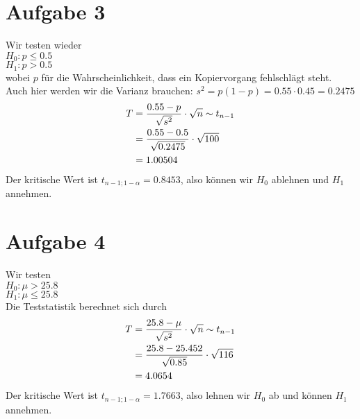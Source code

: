 \documentclass{article}
\begin{document}
	\section*{Aufgabe 3}
	Wir testen wieder \\
	$H_0: p\le 0.5$ \\
	$H_1: p>0.5$ \\
	wobei $p$ für die Wahrscheinlichkeit, dass ein Kopiervorgang fehlschlägt steht. Auch hier werden wir die Varianz brauchen: $s^2=p(1-p)=0.55\cdot 0.45=0.2475$
	\begin{align}
		T &= \frac{0.55-p}{\sqrt{s^2}}\cdot\sqrt{n} \sim t_{n-1} \notag \\
		&= \frac{0.55-0.5}{\sqrt{0.2475}}\cdot\sqrt{100} \notag \\
		&= 1.00504 \notag
	\end{align}
	Der kritische Wert ist $t_{n-1;1-\alpha}=0.8453$, also können wir $H_0$ ablehnen und $H_1$ annehmen.

	\section*{Aufgabe 4}
	Wir testen \\
	$H_0:\mu> 25.8$ \\
	$H_1:\mu\le 25.8$ \\
	Die Teststatistik berechnet sich durch
	\begin{align}
		T &= \frac{25.8 - \mu}{\sqrt{s^2}}\cdot\sqrt{n} \sim t_{n-1} \notag \\
		&= \frac{25.8 - 25.452}{\sqrt{0.85}}\cdot\sqrt{116} \notag \\
		&= 4.0654 \notag
	\end{align}
	Der kritische Wert ist $t_{n-1;1-\alpha}=1.7663$, also lehnen wir $H_0$ ab und können $H_1$ annehmen.
\end{document}
